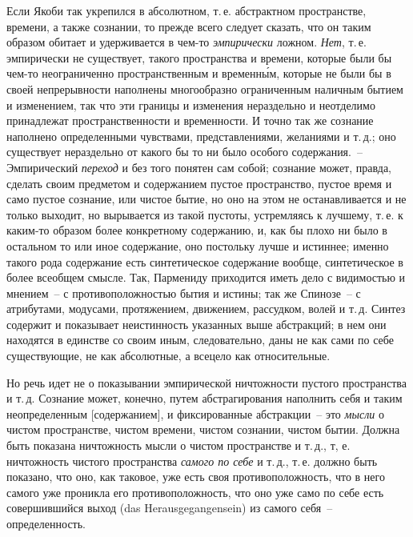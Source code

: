Если Якоби так укрепился в абсолютном, т.\,е. абстрактном
пространстве, времени, а также сознании, то
прежде всего следует сказать, что он таким образом обитает
и удерживается в чем-то \emph{эмпирически} ложном. \emph{Нет},
т.\,е. эмпирически не существует, такого пространства и
времени, которые были бы чем-то неограниченно пространственным
и временн\'ым, которые не были бы в своей
непрерывности наполнены многообразно ограниченным
наличным бытием и изменением, так что эти границы и
изменения нераздельно и неотделимо принадлежат пространственности
и временности. И точно так же сознание
наполнено определенными чувствами, представлениями,
желаниями и т.\,д.; оно существует нераздельно от какого
бы то ни было особого содержания.~-- Эмпирический
\emph{переход} и без того понятен сам собой; сознание может,
правда, сделать своим предметом и содержанием пустое
пространство, пустое время и само пустое сознание, или
чистое бытие, но оно на этом не останавливается и не
только выходит, но вырывается из такой пустоты, устремляясь
к лучшему, т.\,е. к каким-то образом более конкретному
содержанию, и, как бы плохо ни было в остальном
то или иное содержание, оно постольку лучше и истиннее;
именно такого рода содержание есть синтетическое
содержание вообще, синтетическое в более всеобщем
смысле. Так, Пармениду приходится иметь дело с видимостью
и мнением~-- с противоположностью бытия и
истины; так же Спинозе~-- с атрибутами, модусами, протяжением,
движением, рассудком, волей и т.\,д. Синтез
содержит и показывает неистинность указанных выше
абстракций; в нем они находятся в единстве со своим
иным, следовательно, даны не как сами по себе существующие,
не как абсолютные, а всецело как относительные.

Но речь идет не о показывании эмпирической ничтожности
пустого пространства и т.\,д. Сознание может, конечно,
путем абстрагирования наполнить себя и таким неопределенным
[содержанием], и фиксированные абстракции~--
это \emph{мысли} о чистом пространстве, чистом времени, чистом
сознании, чистом бытии. Должна быть показана
ничтожность мысли о чистом пространстве и т.\,д., т, е.
ничтожность чистого пространства \emph{самого по себе} и т.\,д.,
т.\,е. должно быть показано, что оно, как таковое, уже
есть своя противоположность, что в него самого уже проникла
его противоположность, что оно уже само по себе
есть совершившийся выход (das Herausgegangensein) из
самого себя~-- определенность.

